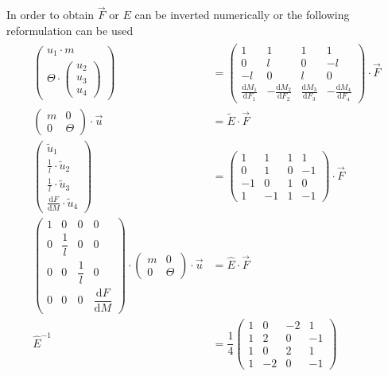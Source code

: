 In order to obtain $\vec{F}$ or $E$ can be inverted numerically or the following reformulation can be used
\begin{align}
\begin{split}
	\begin{pmatrix}
		u_1 \cdot m \\
		\Theta \cdot \begin{pmatrix} u_2 \\ u_3 \\ u_4 \end{pmatrix}
	\end{pmatrix} &= \begin{pmatrix}
		1 & 1 & 1 & 1 \\
		0 & l & 0 & -l \\
		-l & 0 &  l & 0 \\
		\frac{\text{d}M_1}{\text{d}F_1} & -\frac{\text{d}M_2}{\text{d}F_2} & 			\frac{\text{d}M_3}{\text{d}F_3} & -\frac{\text{d}M_4}{\text{d}F_4}
	\end{pmatrix} \cdot \vec{F} 
	\\[0.5em]
	\begin{pmatrix}
		m & 0 \\
		0 & \Theta
	\end{pmatrix} \cdot \vec{u} &= \tilde{E} \cdot \vec{F}
	\\[0.5em]
	\begin{pmatrix} \tilde{u}_1 \\ \frac{1}{l} \cdot \tilde{u}_2 \\ \frac{1}{l} \cdot\tilde{u}_3 \\ \frac{\text{d}F}{\text{d}M} \cdot \tilde{u}_4 \end{pmatrix} &= \begin{pmatrix}
		1 & 1 & 1 & 1 \\
		0 & 1 & 0 & -1 \\
		-1 & 0 &  1 & 0 \\
		1 & -1 & 1 & -1
	\end{pmatrix} \cdot \vec{F}
	\\
	\begin{pmatrix}
		1 & 0 & 0 & 0 \\
		0 & \dfrac{1}{l} & 0 & 0 \\
		0 & 0 & \dfrac{1}{l} & 0 \\
		0 & 0 & 0 & \dfrac{\text{d}F}{\text{d}M}
	\end{pmatrix} \cdot
	\begin{pmatrix}
		m & 0 \\
		0 & \Theta
	\end{pmatrix} \cdot \vec{u} &= \hat{E} \cdot \vec{F}
	\\
	\hat{E}^{-1} &= \dfrac{1}{4}\begin{pmatrix}
		1 &  0 & -2 &  1 \\
		1 &  2 &  0 & -1 \\
		1 &  0 &  2 &  1 \\
		1 & -2 &  0 & -1
	\end{pmatrix}
\end{split} \label{eq:inverseStateSpaceInput}
\end{align} 
